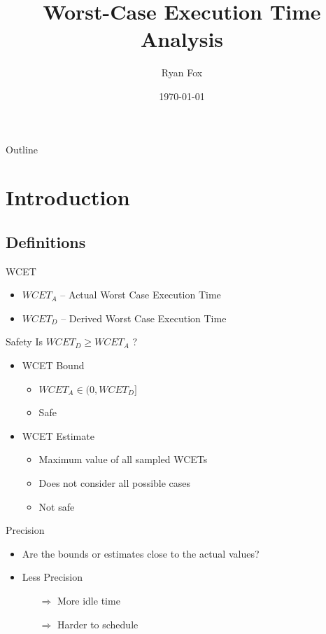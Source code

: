 \documentclass{beamer}
\title{Worst-Case Execution Time Analysis}
\author{Ryan Fox}
\institute
{
  Department of Electrical and Computer Engineering\\
  University of Waterloo
}
\date{\today}
\begin{document}
\begin{frame}
  \titlepage
\end{frame}

\begin{frame}{Outline}
  \tableofcontents[pausesections]
\end{frame}

\section{Introduction}
\subsection{Definitions}

\begin{frame}{WCET}
  \begin{itemize}
    \item $WCET_A$ -- Actual Worst Case Execution Time
    \item $WCET_D$ -- Derived Worst Case Execution Time
  \end{itemize}
\end{frame}

\begin{frame}{Safety}
  Is $WCET_D \geq WCET_A$ ?
  \begin{itemize}
    \item WCET Bound
      \begin{itemize}
        \item $WCET_A \in (0, WCET_D]$
        \item Safe
      \end{itemize}      
      \pause
    \item WCET Estimate
      \begin{itemize}
        \item Maximum value of all sampled WCETs
        \item Does not consider all possible cases
        \item Not safe          
      \end{itemize}      
  \end{itemize}
\end{frame}

\begin{frame}{Precision}
  \begin{itemize}
    \item Are the bounds or estimates close to the actual values? \\
      \pause
    \item Less Precision
      \begin{itemize}
      \item[$\Rightarrow$] More idle time
      \item[$\Rightarrow$] Harder to schedule
      \end{itemize}
  \end{itemize}
\end{frame}
\end{document}
